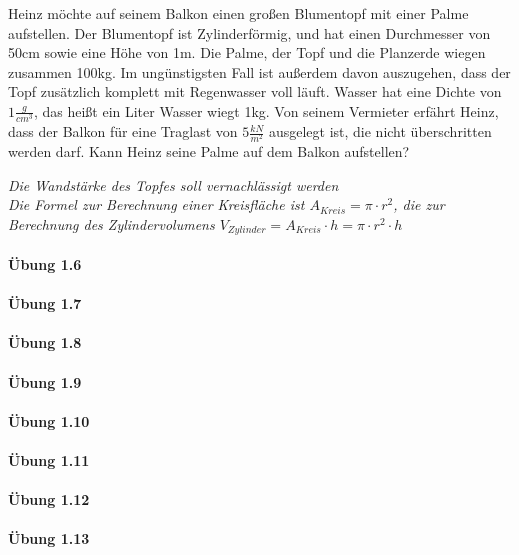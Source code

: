 Heinz möchte auf seinem Balkon einen großen Blumentopf mit einer Palme aufstellen. Der Blumentopf ist Zylinderförmig, und hat einen Durchmesser von 50cm sowie eine Höhe von 1m. Die Palme, der Topf und die Planzerde wiegen zusammen 100kg. Im ungünstigsten Fall ist außerdem davon auszugehen, dass der Topf zusätzlich komplett mit Regenwasser voll läuft. Wasser hat eine Dichte von $1\frac{g}{cm^3}$, das heißt ein Liter Wasser wiegt 1kg. Von seinem Vermieter erfährt Heinz, dass der Balkon für eine Traglast von $5\frac{kN}{m^2}$ ausgelegt ist, die nicht überschritten werden darf. Kann Heinz seine Palme auf dem Balkon aufstellen?

\textit{Die Wandstärke des Topfes soll vernachlässigt werden\\Die Formel zur Berechnung einer Kreisfläche ist $A_{Kreis}=\pi \cdot r^2$, die zur Berechnung des Zylindervolumens $V_{Zylinder}=A_{Kreis} \cdot h=\pi \cdot r^2 \cdot h $}

\paragraph{Übung 1.6}

\paragraph{Übung 1.7}

\paragraph{Übung 1.8}

\paragraph{Übung 1.9}

\paragraph{Übung 1.10}


\paragraph{Übung 1.11}

\paragraph{Übung 1.12}

\paragraph{Übung 1.13}


